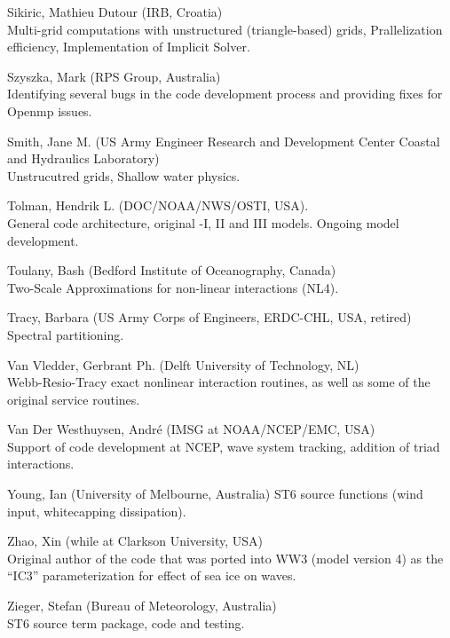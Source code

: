 \begin{list}{\ldots}{ }
\item [Sikiric, Mathieu Dutour] (IRB, Croatia) \\
  Multi-grid computations with unstructured (triangle-based) grids, Prallelization efficiency, Implementation of Implicit Solver.

\item [Szyszka, Mark] (RPS Group, Australia) \\
  Identifying several bugs in the code development process and providing fixes for Openmp issues.

\item [Smith, Jane M.] (US Army Engineer Research and Development Center Coastal and Hydraulics Laboratory) \\
 Unstrucutred grids, Shallow water physics.

\item [Tolman, Hendrik L.] (DOC/NOAA/NWS/OSTI, USA). \\
  General code architecture, original \wt-I, II and III models. Ongoing model
  development.

\item [Toulany, Bash] (Bedford Institute of Oceanography, Canada)\\
 Two-Scale Approximations for non-linear interactions (NL4).

\item [Tracy, Barbara] (US Army Corps of Engineers, ERDC-CHL, USA, retired) \\
  Spectral partitioning.

\item [Van Vledder, Gerbrant Ph.] (Delft University of Technology, NL) \\
  Webb-Resio-Tracy exact nonlinear interaction routines, as well as some of
  the original service routines.

\item [Van Der Westhuysen, Andr\'e](IMSG at NOAA/NCEP/EMC, USA) \\
  Support of code development at NCEP, wave system tracking, addition of triad interactions.

\item [Young, Ian] (University of Melbourne, Australia)
  ST6 source functions (wind input, whitecapping dissipation).

\item [Zhao, Xin] (while at Clarkson University, USA) \\
  Original author of the code that was ported into WW3 (model version 4) as the ``IC3'' parameterization for effect of sea ice on waves.

\item [Zieger, Stefan] (Bureau of Meteorology, Australia) \\
  ST6 source term package, code and testing.
\end{list}

